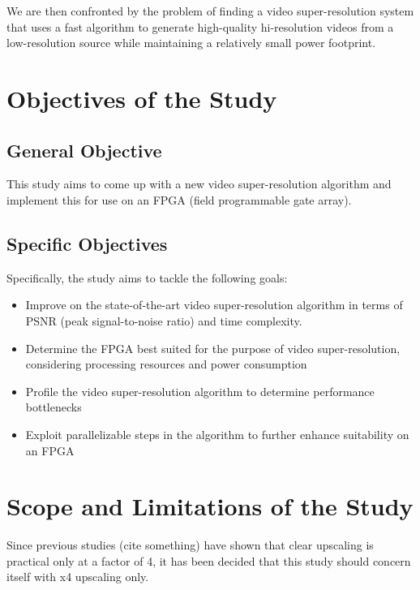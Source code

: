 We are then confronted by the problem of finding a video super-resolution system that uses a fast algorithm to generate high-quality hi-resolution videos from a low-resolution source while maintaining a relatively small power footprint.

\section{Objectives of the Study}

\subsection{General Objective}

This study aims to come up with a new video super-resolution algorithm and implement this for use on an FPGA (field programmable gate array).


\subsection{Specific Objectives}

Specifically, the study aims to tackle the following goals:

\begin{itemize}
	\item Improve on the state-of-the-art video super-resolution algorithm in terms of PSNR (peak signal-to-noise ratio) and time complexity. 
	\item Determine the FPGA best suited for the purpose of video super-resolution, considering processing resources and power consumption
	\item Profile the video super-resolution algorithm to determine performance bottlenecks
	\item Exploit parallelizable steps in the algorithm to further enhance suitability on an FPGA
\end{itemize}


\section{Scope and Limitations of the Study}

Since previous studies (cite something) have shown that clear upscaling is practical only at a factor of 4, 
it has been decided that this study should concern itself with x4 upscaling only.


